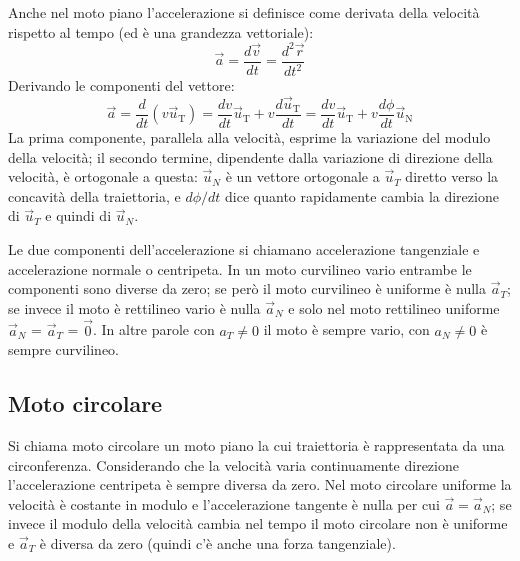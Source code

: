 \documentclass[class=book, crop=false, oneside, 12pt]{standalone}
\begin{document}
Anche nel moto piano l'accelerazione si definisce come derivata della velocità rispetto al tempo (ed è una grandezza vettoriale): 
\begin{equation}
  \overrightarrow{a} = \frac{d \overrightarrow{v}}{dt} = \frac{d^2 \overrightarrow{r}}{dt^2}
\end{equation}
Derivando le componenti del vettore:
\begin{equation}
  \overrightarrow{a}=\frac{d}{d t}\left(v \overrightarrow{u}_{\mathrm{T}}\right)=\frac{d v}{d t} \overrightarrow{u}_{\mathrm{T}}+v \frac{d \overrightarrow{u}_{\mathrm{T}}}{d t}=\frac{d v}{d t} \overrightarrow{u}_{\mathrm{T}}+v \frac{d \phi}{d t} \overrightarrow{u}_{\mathrm{N}}
\end{equation}
La prima componente, parallela alla velocità, esprime la variazione del modulo della velocità; il secondo termine, dipendente dalla variazione di direzione della velocità, è ortogonale a questa:
\(\overrightarrow{u}_N\) è un vettore ortogonale a \(\overrightarrow{u}_T\) diretto verso la concavità della traiettoria, e \(d \phi/dt \) dice quanto rapidamente cambia la direzione di \(\overrightarrow{u}_T\)  e quindi di \(\overrightarrow{u}_N\). 

Le due componenti dell'accelerazione si chiamano accelerazione tangenziale e accelerazione normale o centripeta. 
In un moto curvilineo vario entrambe le componenti sono diverse da zero; se però il moto curvilineo è uniforme è nulla \(\overrightarrow{a}_T\); se invece il moto è rettilineo vario è nulla \(\overrightarrow{a}_N\) e solo nel moto rettilineo uniforme \(\overrightarrow{a}_N\) = \(\overrightarrow{a}_T\) = \(\overrightarrow{0}\).
In altre parole con \(a_T \neq 0\) il moto è sempre vario, con \(a_N \neq 0\) è  sempre curvilineo. 

\subsection{Moto circolare}

Si chiama moto circolare un moto piano la cui traiettoria è rappresentata da una circonferenza. Considerando che la velocità varia continuamente direzione l'accelerazione centripeta è sempre diversa da zero.
Nel moto circolare uniforme la velocità è costante in modulo e l'accelerazione tangente è nulla per cui \(\overrightarrow{a} = \overrightarrow{a}_N\);
se invece il modulo della velocità cambia nel tempo il moto circolare non è uniforme e \(\overrightarrow{a}_T\) è diversa da zero (quindi c'è anche una forza tangenziale).
\end{document}
